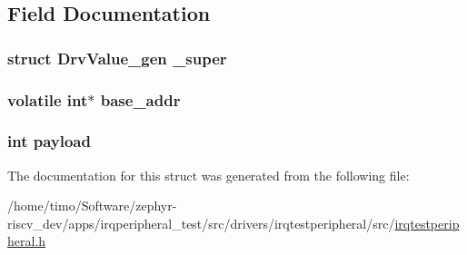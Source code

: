 \subsection{Field Documentation}
\subsubsection[{\texorpdfstring{\+\_\+super}{_super}}]{\setlength{\rightskip}{0pt plus 5cm}struct {\bf Drv\+Value\+\_\+gen} \+\_\+super}\hypertarget{struct_drv_value__int_ad6a22febddaa20faa4af2f9fed5766f0}{}\label{struct_drv_value__int_ad6a22febddaa20faa4af2f9fed5766f0}
\subsubsection[{\texorpdfstring{base\+\_\+addr}{base_addr}}]{\setlength{\rightskip}{0pt plus 5cm}volatile int$\ast$ base\+\_\+addr}\hypertarget{struct_drv_value__int_ae2918bea8bf855b64182bd166cb8966d}{}\label{struct_drv_value__int_ae2918bea8bf855b64182bd166cb8966d}
\subsubsection[{\texorpdfstring{payload}{payload}}]{\setlength{\rightskip}{0pt plus 5cm}int payload}\hypertarget{struct_drv_value__int_a86d3b28b783f5b0e9cf208f0461a6f0b}{}\label{struct_drv_value__int_a86d3b28b783f5b0e9cf208f0461a6f0b}


The documentation for this struct was generated from the following file\+:\begin{DoxyCompactItemize}
\item 
/home/timo/\+Software/zephyr-\/riscv\+\_\+dev/apps/irqperipheral\+\_\+test/src/drivers/irqtestperipheral/src/\hyperlink{irqtestperipheral_8h}{irqtestperipheral.\+h}\end{DoxyCompactItemize}
